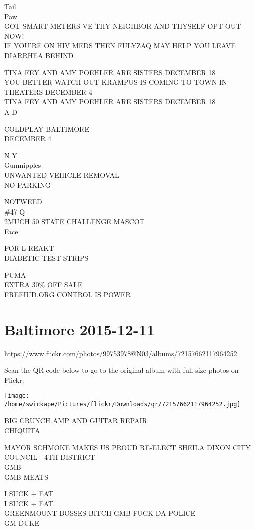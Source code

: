 \documentclass[10pt,letterpaper]{article}
\begin{document}
Tail\\
Paw\\
GOT SMART METERS VE THY NEIGHBOR AND THYSELF OPT OUT NOW!\\
IF YOU'RE ON HIV MEDS THEN FULYZAQ MAY HELP YOU LEAVE DIARRHEA BEHIND

TINA FEY AND AMY POEHLER ARE SISTERS DECEMBER 18\\
YOU BETTER WATCH OUT KRAMPUS IS COMING TO TOWN IN THEATERS DECEMBER 4\\
TINA FEY AND AMY POEHLER ARE SISTERS DECEMBER 18\\
A{-}D

COLDPLAY BALTIMORE\\
DECEMBER 4

N Y\\
Gumnipples\\
UNWANTED VEHICLE REMOVAL\\
NO PARKING

NOTWEED\\
\#47 Q\\
2MUCH 50 STATE CHALLENGE MASCOT\\
Face

FOR L REAKT\\
DIABETIC TEST STRIPS

PUMA\\
EXTRA 30\% OFF SALE\\
FREEIUD.ORG CONTROL IS POWER


\section*{Baltimore 2015-12-11}

\url{https://www.flickr.com/photos/99753978@N03/albums/72157662117964252}

Scan the QR code below to go to the original album with full-size photos on Flickr:

\texttt{[image: /home/swickape/Pictures/flickr/Downloads/qr/72157662117964252.jpg]}


BIG CRUNCH AMP AND GUITAR REPAIR\\
CHIQUITA

MAYOR SCHMOKE MAKES US PROUD RE{-}ELECT SHEILA DIXON CITY COUNCIL {-} 4TH DISTRICT\\
GMB\\
GMB MEATS

I SUCK + EAT\\
I SUCK + EAT\\
GREENMOUNT BOSSES BITCH GMB FUCK DA POLICE\\
GM DUKE
\end{document}
